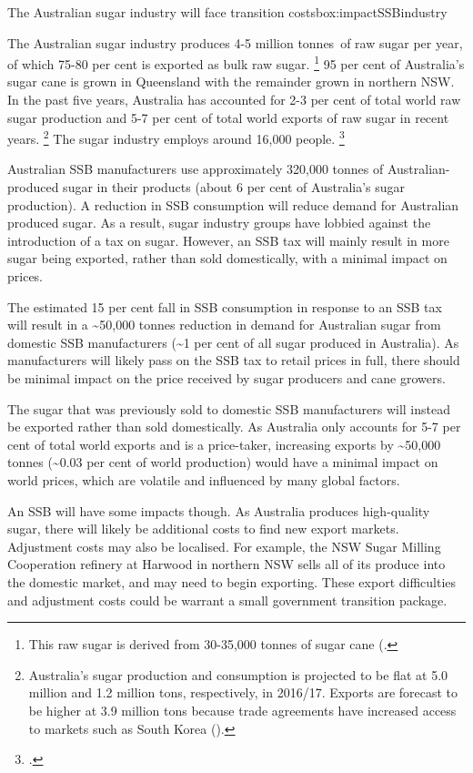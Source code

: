 \documentclass[embargoed]{grattan}
\begin{document}
\begin{bigbox*}{The Australian sugar industry will face transition costs}{box:impactSSBindustry}

The Australian sugar industry produces 4-5 million tonnes~of raw sugar per year, of which 75-80 per cent is exported as bulk raw sugar.%
\footnote{This raw sugar is derived from 30-35,000 tonnes of sugar cane (\textcites{Canegrowers2015Statisticsfacts}{Agriculture2016SugarWorldMarkets}{Council2016Sugarcanestatistics}.} 95 per cent of Australia's sugar cane is grown in Queensland with the remainder grown in northern NSW.
In the past five years, Australia has accounted for 2-3 per cent of total world raw sugar production and 5-7 per cent of total world exports of raw sugar in recent years.%
\footnote{Australia's sugar production and consumption is projected to be flat at 5.0 million and 1.2 million tons, respectively, in 2016/17.
Exports are forecast to be higher at 3.9 million tons because trade agreements have increased access to markets such as South Korea (\textcite{Agriculture2016SugarWorldMarkets}).} The sugar industry employs around 16,000 people.%
\footcite{Council2016Sugarcanestatistics}

Australian SSB manufacturers use approximately 320,000 tonnes of Australian-produced sugar in their products (about 6 per cent of Australia's sugar production).
A reduction in SSB consumption will reduce demand for Australian produced sugar.
As a result, sugar industry groups have lobbied against the introduction of a tax on sugar.
However, an SSB tax will mainly result in more sugar being exported, rather than sold domestically, with a minimal impact on prices.

The estimated 15 per cent fall in SSB consumption in response to an SSB tax will result in a \textasciitilde{}50,000 tonnes reduction in demand for Australian sugar from domestic SSB manufacturers (\textasciitilde{}1 per cent of all sugar produced in Australia).
As manufacturers will likely pass on the SSB tax to retail prices in full, there should be minimal impact on the price received by sugar producers and cane growers.

The sugar that was previously sold to domestic SSB manufacturers will instead be exported rather than sold domestically.
As Australia only accounts for 5-7 per cent of total world exports and is a price-taker, increasing exports by \textasciitilde{}50,000 tonnes (\textasciitilde{}0.03 per cent of world production) would have a minimal impact on world prices, which are volatile and influenced by many global factors. 

An SSB will have some impacts though.
As Australia produces high-quality sugar, there will likely be additional costs to find new export markets.
Adjustment costs may also be localised.
For example, the NSW Sugar Milling Cooperation refinery at Harwood in northern NSW sells all of its produce into the domestic market, and may need to begin exporting.
These export difficulties and adjustment costs could be warrant a small government transition package.
\end{bigbox*}
\end{document}
